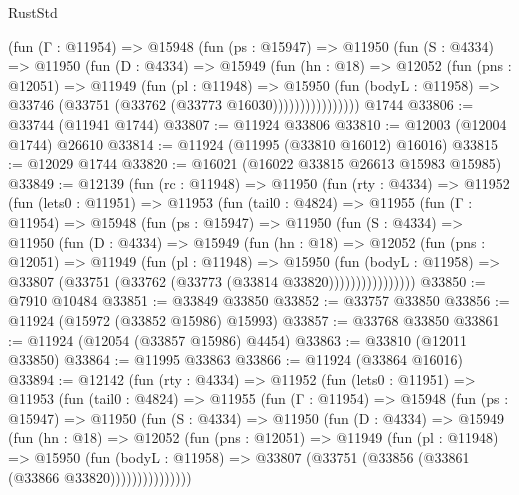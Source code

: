 \begin{lexlean}{RustStd}
\begin{coremodule}
{\begin{coremodule}
{{{{{{{{{{{{{{{{{{{{{{{{{{{{{{{{{{{{{{{{{{{{{{{{{{{{{{{{{{{{{{{{{{{{{{{{{{{{{{{{              (fun (Γ : @11954) =>
              @15948
                (fun (ps : @15947) =>
                @11950
                  (fun (S : @4334) =>
                  @11950
                    (fun (D : @4334) =>
                    @15949
                      (fun (hn : @18) =>
                      @12052
                        (fun (pns : @12051) =>
                        @11949
                          (fun (pl : @11948) =>
                          @15950
                            (fun (bodyL : @11958) =>
                            @33746 (@33751 (@33762 (@33773 @16030))))))))))))))))
    @1744
@33806 := @33744 (@11941 @1744)
@33807 := @11924 @33806
@33810 := @12003 (@12004 @1744) @26610
@33814 := @11924 (@11995 (@33810 @16012) @16016)
@33815 := @12029 @1744
@33820 := @16021 (@16022 @33815 @26613 @15983 @15985)
@33849 := @12139
    (fun (rc : @11948) =>
    @11950
      (fun (rty : @4334) =>
      @11952
        (fun (lets0 : @11951) =>
        @11953
          (fun (tail0 : @4824) =>
          @11955
            (fun (Γ : @11954) =>
            @15948
              (fun (ps : @15947) =>
              @11950
                (fun (S : @4334) =>
                @11950
                  (fun (D : @4334) =>
                  @15949
                    (fun (hn : @18) =>
                    @12052
                      (fun (pns : @12051) =>
                      @11949
                        (fun (pl : @11948) =>
                        @15950
                          (fun (bodyL : @11958) =>
                          @33807 (@33751 (@33762 (@33773 (@33814 @33820))))))))))))))))
@33850 := @7910 @10484
@33851 := @33849 @33850
@33852 := @33757 @33850
@33856 := @11924 (@15972 (@33852 @15986) @15993)
@33857 := @33768 @33850
@33861 := @11924 (@12054 (@33857 @15986) @4454)
@33863 := @33810 (@12011 @33850)
@33864 := @11995 @33863
@33866 := @11924 (@33864 @16016)
@33894 := @12142
    (fun (rty : @4334) =>
    @11952
      (fun (lets0 : @11951) =>
      @11953
        (fun (tail0 : @4824) =>
        @11955
          (fun (Γ : @11954) =>
          @15948
            (fun (ps : @15947) =>
            @11950
              (fun (S : @4334) =>
              @11950
                (fun (D : @4334) =>
                @15949
                  (fun (hn : @18) =>
                  @12052
                    (fun (pns : @12051) =>
                    @11949
                      (fun (pl : @11948) =>
                      @15950
                        (fun (bodyL : @11958) =>
                        @33807 (@33751 (@33856 (@33861 (@33866 @33820)))))))))))))))
}}}}}}}}}}}}}}}}}}}}}}}}}}}}}}}}}}}}}}}}}}}}}}}}}}}}}}}}}}}}}}}}}}}}}}}}}}}}}}}}
\end{coremodule}}
\end{coremodule}
\end{lexlean}
